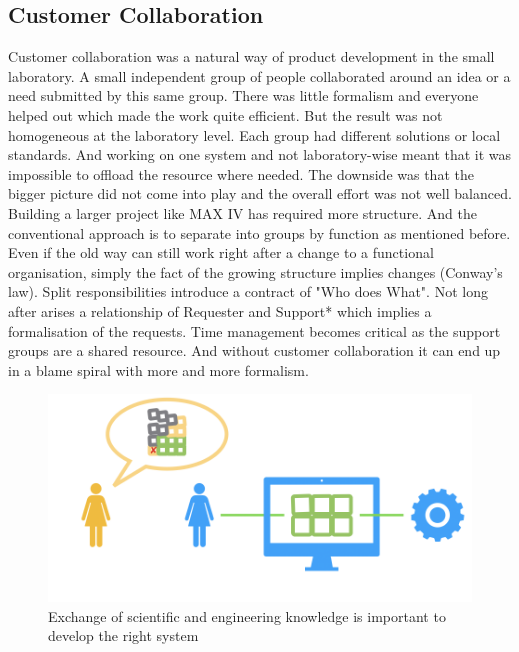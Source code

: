 \documentclass[a4paper,
              ]{jacow}
\begin{document}
\subsection{Customer Collaboration}
Customer collaboration was a natural way of product development in the small laboratory. A small independent group of people collaborated around an idea or a need submitted by this same group. There was little formalism and everyone helped out which made the work quite efficient. But the result was not homogeneous at the laboratory level. Each group had different solutions or local standards. And working on one system and not laboratory-wise meant that it was impossible to offload the resource where needed. The downside was that the bigger picture did not come into play and the overall effort was not well balanced.
Building a larger project like MAX IV has required more structure. And the conventional approach is to separate into groups by function as mentioned before. Even if the old way can still work right after a change to a functional organisation, simply the fact of the growing structure implies changes (Conway's law). Split responsibilities introduce a contract of "Who does What". Not long after arises a relationship of Requester and Support* which implies a formalisation of the requests. Time management becomes critical as the support groups are a shared resource. And without customer collaboration it can end up in a blame spiral with more and more formalism.

\begin{figure}[!tbh]
    \centering
    \includegraphics*[scale=0.3]{WEMPL008f3}
    \caption{Exchange of scientific and engineering knowledge is important to develop the right system}
    \label{WEMPL008f3}
\end{figure}
\end{document}
